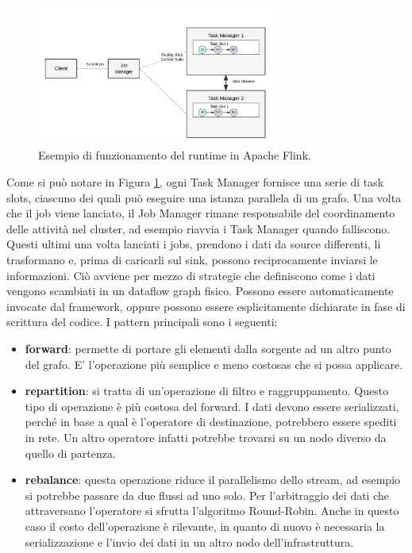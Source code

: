 \begin{figure}[htbp]
    \centering
    \includegraphics[width=0.7\textwidth]{figures/flink-architecture-simple-final.png}
    \caption{Esempio di funzionamento del runtime in Apache Flink.}
    \label{fig:flink-arch}
\end{figure}

Come si può notare in Figura \ref{fig:flink-arch}, ogni Task Manager fornisce una serie di task slots, ciascuno dei quali può eseguire una istanza parallela di un grafo. Una volta che il job viene lanciato, il Job Manager rimane responsabile del coordinamento delle attività nel cluster, ad esempio riavvia i Task Manager quando falliscono. Questi ultimi una volta lanciati i jobs, prendono i dati da source differenti, li trasformano e, prima di caricarli sul sink, possono reciprocamente inviarsi le informazioni. 
Ciò avviene per mezzo di strategie che definiscono come i dati vengono scambiati in un dataflow graph fisico. Possono essere automaticamente invocate dal framework, oppure possono essere esplicitamente dichiarate in fase di scrittura del codice. I pattern principali sono i seguenti:

\begin{itemize}
	\item \textbf{forward}: permette di portare gli elementi dalla sorgente ad un altro punto del grafo. E' l'operazione più semplice e meno costosas che si possa applicare.
	\item \textbf{repartition}: si tratta di un'operazione di filtro e raggruppamento. Questo tipo di operazione è più costosa del forward. I dati devono essere serializzati, perché in base a qual è l'operatore di destinazione, potrebbero essere spediti in rete. Un altro operatore infatti potrebbe trovarsi su un nodo diverso da quello di partenza.
	\item \textbf{rebalance}: questa operazione riduce il parallelismo dello stream, ad esempio si potrebbe passare da due flussi ad uno solo. Per l'arbitraggio dei dati che attraversano l'operatore si sfrutta l'algoritmo Round-Robin. Anche in questo caso il costo dell'operazione è rilevante, in quanto di nuovo è necessaria la serializzazione e l'invio dei dati in un altro nodo dell'infrastruttura.
\end{itemize}  

